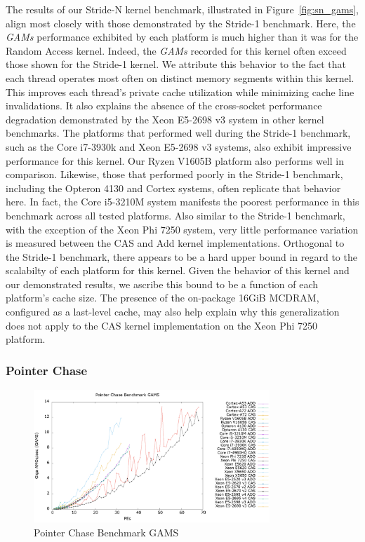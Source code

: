 The results of our Stride-N kernel benchmark, illustrated in Figure~\ref{fig:sn_gams}, align most closely with those demonstrated by the Stride-1 benchmark.
Here, the \textit{GAMs} performance exhibited by each platform is much higher than it was for the Random Access kernel.
Indeed, the \textit{GAMs} recorded for this kernel often exceed those shown for the Stride-1 kernel.
We attribute this behavior to the fact that each thread operates most often on distinct memory segments within this kernel.
This improves each thread's private cache utilization while minimizing cache line invalidations.
It also explains the absence of the cross-socket performance degradation demonstrated by the Xeon E5-2698 v3 system in other kernel benchmarks.
The platforms that performed well during the Stride-1 benchmark, such as the Core i7-3930k and Xeon E5-2698 v3 systems, also exhibit impressive performance for this kernel.
Our Ryzen V1605B platform also performs well in comparison.
Likewise, those that performed poorly in the Stride-1 benchmark, including the Opteron 4130 and Cortex systems, often replicate that behavior here.
In fact, the Core i5-3210M system manifests the poorest performance in this benchmark across all tested platforms.
Also similar to the Stride-1 benchmark, with the exception of the Xeon Phi 7250 system, very little performance variation is measured between the CAS and Add kernel implementations.
Orthogonal to the Stride-1 benchmark, there appears to be a hard upper bound in regard to the scalabilty of each platform for this kernel.
Given the behavior of this kernel and our demonstrated results, we ascribe this bound to be a function of each platform's cache size.
The presence of the on-package 16GiB MCDRAM, configured as a last-level cache, may also help explain why this generalization does not apply to the CAS kernel implementation on the Xeon Phi 7250 platform.

\subsubsection{Pointer Chase}
\label{subsubsec:ptrchase_res}

\begin{figure}[!t]
\centering
\includegraphics[width=3.5in]{figures/PTRCHASE_GAMS.png}
\caption{Pointer Chase Benchmark GAMS}
\label{fig:ptrchase_gams}
\end{figure}


